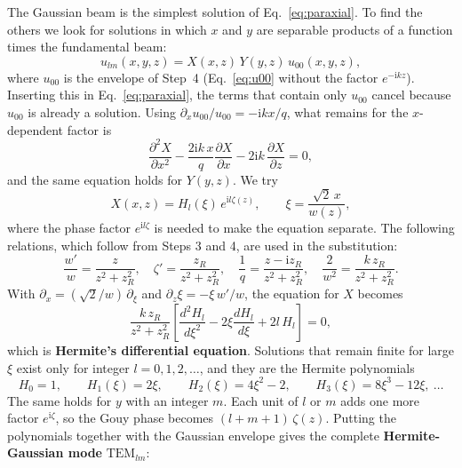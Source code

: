 \documentclass[11pt,a4paper]{article}
\begin{document}
	The Gaussian beam is the simplest solution of Eq.~\eqref{eq:paraxial}. To find the others we look for solutions in which $x$ and $y$ are separable products of a function times the fundamental beam:
	\begin{equation}
		u_{lm}(x,y,z)=X(x,z)\,Y(y,z)\,u_{00}(x,y,z),
	\end{equation}
	where $u_{00}$ is the envelope of Step~4 (Eq.~\eqref{eq:u00} without the factor $e^{-\mathrm{i}kz}$). Inserting this in Eq.~\eqref{eq:paraxial}, the terms that contain only $u_{00}$ cancel because $u_{00}$ is already a solution. Using $\partial_xu_{00}/u_{00}=-\mathrm{i}kx/q$, what remains for the $x$-dependent factor is
	\begin{equation}
		\frac{\partial^2X}{\partial x^2}-\frac{2\mathrm{i}k\,x}{q}\frac{\partial X}{\partial x}-2\mathrm{i}k\,\frac{\partial X}{\partial z}=0 ,
	\end{equation}
	and the same equation holds for $Y(y,z)$. We try
	\begin{equation}
		X(x,z)=H_l(\xi)\,e^{\mathrm{i}l\zeta(z)},\qquad \xi=\frac{\sqrt2\,x}{w(z)} ,
	\end{equation}
	where the phase factor $e^{\mathrm{i}l\zeta}$ is needed to make the equation separate. The following relations, which follow from Steps 3 and 4, are used in the substitution:
	\begin{equation}
		\frac{w'}{w}=\frac{z}{z^2+z_R^2},\quad
		\zeta'=\frac{z_R}{z^2+z_R^2},\quad
		\frac1q=\frac{z-\mathrm{i}z_R}{z^2+z_R^2},\quad
		\frac{2}{w^2}=\frac{k\,z_R}{z^2+z_R^2}.
	\end{equation}
	With $\partial_x=(\sqrt2/w)\,\partial_\xi$ and $\partial_z\xi=-\xi\,w'/w$, the equation for $X$ becomes
	\begin{equation}
		\frac{k\,z_R}{z^2+z_R^2}\left[\frac{d^2H_l}{d\xi^2}-2\xi\frac{dH_l}{d\xi}+2l\,H_l\right]=0 ,
	\end{equation}
	which is \textbf{Hermite's differential equation}. Solutions that remain finite for large $\xi$ exist only for integer $l=0,1,2,\dots$, and they are the Hermite polynomials
	\begin{equation}
		H_0=1,\qquad H_1(\xi)=2\xi,\qquad H_2(\xi)=4\xi^2-2,\qquad H_3(\xi)=8\xi^3-12\xi,\ \dots
	\end{equation}
	The same holds for $y$ with an integer $m$. Each unit of $l$ or $m$ adds one more factor $e^{\mathrm{i}\zeta}$, so the Gouy phase becomes $(l+m+1)\,\zeta(z)$. Putting the polynomials together with the Gaussian envelope gives the complete \textbf{Hermite-Gaussian mode} $\mathrm{TEM}_{lm}$:
\end{document}
